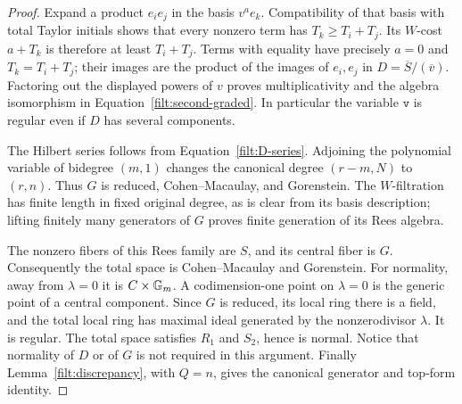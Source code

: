 \begin{proof}
Expand a product $e_ie_j$ in the basis $v^ae_k$.  Compatibility of that
basis with total Taylor initials shows that every nonzero term has
$T_k\geq T_i+T_j$.  Its $W$-cost $a+T_k$ is therefore at least
$T_i+T_j$.  Terms with equality have precisely $a=0$ and
$T_k=T_i+T_j$; their images are the product of the images of $e_i,e_j$
in $D=\overline S/(\overline v)$.  Factoring out the displayed powers
of $v$ proves multiplicativity and the algebra isomorphism in
Equation~\eqref{filt:second-graded}.  In particular the variable
$\mathtt v$ is regular even if $D$ has several components.

The Hilbert series follows from Equation~\eqref{filt:D-series}.
Adjoining the polynomial variable of bidegree $(m,1)$ changes the
canonical degree $(r-m,N)$ to $(r,n)$.  Thus $G$ is reduced,
Cohen--Macaulay, and Gorenstein.  The $W$-filtration has finite length in
fixed original degree, as is clear from its basis description; lifting
finitely many generators of $G$ proves finite generation of its Rees
algebra.

The nonzero fibers of this Rees family are $S$, and its central fiber
is $G$.  Consequently the total space is Cohen--Macaulay and Gorenstein.
For normality, away from $\lambda=0$ it is $C\times\mathbb G_m$.  A
codimension-one point on $\lambda=0$ is the generic point of a central
component.  Since $G$ is reduced, its local ring there is a field, and
the total local ring has maximal ideal generated by the nonzerodivisor
$\lambda$.  It is regular.  The total space satisfies $R_1$ and $S_2$,
hence is normal.  Notice that normality of $D$ or of $G$ is not required
in this argument.  Finally Lemma~\ref{filt:discrepancy}, with $Q=n$,
gives the canonical generator and top-form identity.
\end{proof}

